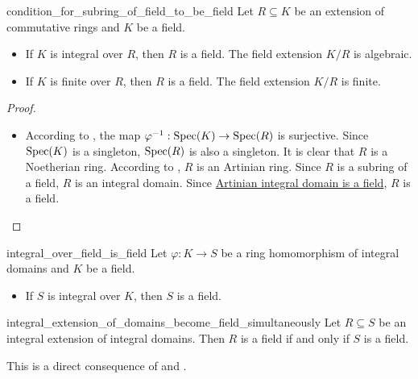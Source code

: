 \begin{proposition}{}{condition_for_subring_of_field_to_be_field}
    Let $R\subseteq K$ be an extension of commutative rings and $K$ be a field. 
    \begin{itemize}
        \item If $K$ is integral over $R$, then $R$ is a field. The field extension $K/R$ is algebraic.
        \item If $K$ is finite over $R$, then $R$ is a field. The field extension $K/R$ is finite.
    \end{itemize}
\end{proposition}
\begin{proof}
    \begin{itemize}
        \item According to , the map $\varphi^{-1}:\operatorname{Spec} (K)\to \operatorname{Spec} (R)$ is surjective. Since $\operatorname{Spec} (K)$ is a singleton, $\operatorname{Spec} (R)$ is also a singleton. It is clear that $R$ is a Noetherian ring. According to , $R$ is an Artinian ring. Since $R$ is a subring of a field, $R$ is an integral domain. Since \hyperref[th:artinian_integral_domain_is_a_field]{Artinian integral domain is a field}, $R$ is a field.
    \end{itemize}
\end{proof}

\begin{proposition}{}{integral_over_field_is_field}
    Let $\varphi:K\to S$ be a ring homomorphism of integral domains and $K$ be a field. 
    \begin{itemize}
        \item If $S$ is integral over $K$, then $S$ is a field.
    \end{itemize}
\end{proposition}

\begin{corollary}{}{integral_extension_of_domains_become_field_simultaneously}
    Let $R\subseteq S$ be an integral extension of integral domains. Then $R$ is a field if and only if $S$ is a field.
\end{corollary}

\begin{prf}
    This is a direct consequence of  and .
\end{prf}

